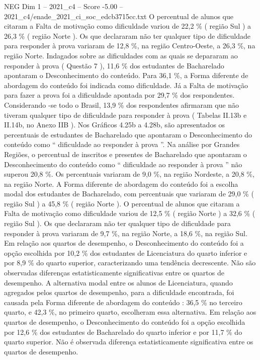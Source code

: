 \begin{textsample}{NEG Dim 1 – 2021\_c4 – Score -5.00 – 2021\_c4/enade\_2021\_ci\_soc\_edcb3715cc.txt}
O percentual de alunos que citaram a Falta de motivação como dificuldade variou de 22,2 \% ( região Sul ) a 26,3 \% ( região Norte ).
Os que declararam não ter qualquer tipo de dificuldade para responder à prova variaram de 12,8 \%, na região Centro-Oeste, a 26,3 \%, na região Norte.
Indagados sobre as dificuldades com as quais se depararam ao responder à prova ( Questão 7 ), 11,6 \% dos estudantes de Bacharelado apontaram o Desconhecimento do conteúdo.
Para 36,1 \%, a Forma diferente de abordagem do conteúdo foi indicada como dificuldade.
Já a Falta de motivação para fazer a prova foi a dificuldade apontada por 29,7 \% dos respondentes.
Considerando -se todo o Brasil, 13,9 \% dos respondentes afirmaram que não tiveram qualquer tipo de dificuldade para responder à prova ( Tabelas II.13b e II.14b, no Anexo IIB ).
Nos Gráficos 4.25b a 4.28b, são apresentados os percentuais de estudantes de Bacharelado que apontaram o Desconhecimento do conteúdo como “ dificuldade ao responder à prova ”.
Na análise por Grandes Regiões, o percentual de inscritos e presentes de Bacharelado que apontaram o Desconhecimento do conteúdo como “ dificuldade ao responder à prova ” não superou 20,8 \%.
Os percentuais variaram de 9,0 \%, na região Nordeste, a 20,8 \%, na região Norte.
A Forma diferente de abordagem do conteúdo foi a escolha modal dos estudantes de Bacharelado, com percentuais que variaram de 29,0 \% ( região Sul ) a 45,8 \% ( região Norte ).
O percentual de alunos que citaram a Falta de motivação como dificuldade variou de 12,5 \% ( região Norte ) a 32,6 \% ( região Sul ).
Os que declararam não ter qualquer tipo de dificuldade para responder à prova variaram de 9,7 \%, na região Norte, a 18,6 \%, na região Sul.
Em relação aos quartos de desempenho, o Desconhecimento do conteúdo foi a opção escolhida por 10,2 \% dos estudantes de Licenciatura do quarto inferior e por 8,9 \% do quarto superior, caracterizando uma tendência decrescente.
Não são observadas diferenças estatisticamente significativas entre os quartos de desempenho.
A alternativa modal entre os alunos de Licenciatura, quando agregados pelos quartos de desempenho, para a dificuldade encontrada, foi causada pela Forma diferente de abordagem do conteúdo : 36,5 \% no terceiro quarto, e 42,3 \%, no primeiro quarto, escolheram essa alternativa.
Em relação aos quartos de desempenho, o Desconhecimento do conteúdo foi a opção escolhida por 12,6 \% dos estudantes de Bacharelado do quarto inferior e por 11,7 \% do quarto superior.
Não é observada diferença estatisticamente significativa entre os quartos de desempenho.

\end{textsample}
